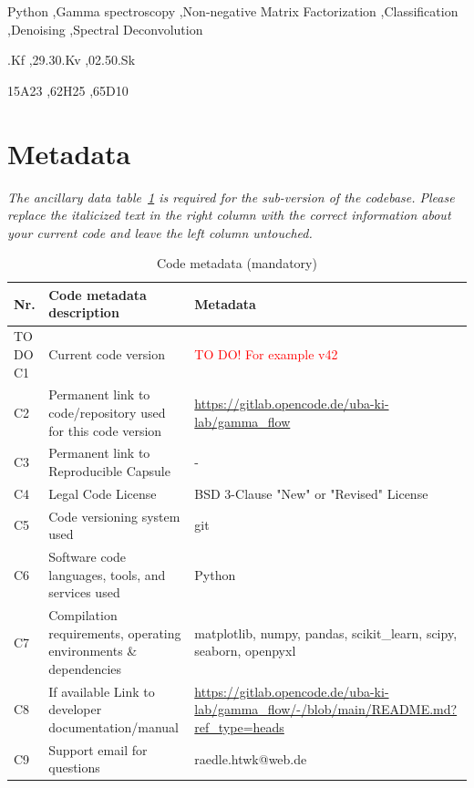 \documentclass[preprint,12pt, a4paper]{elsarticle}
\begin{document}
\begin{frontmatter}
\begin{keyword}
Python \sep Gamma spectroscopy \sep Non-negative Matrix Factorization \sep Classification \sep Denoising \sep Spectral Deconvolution

.Kf %
\sep 29.30.Kv %
\sep 02.50.Sk %

\MSC[2020] 15A23 %
\sep 62H25 %
\sep 65D10 %

\end{keyword}

\end{frontmatter}


\section*{Metadata}
\textit{The ancillary data table~\ref{codeMetadata} is required for the sub-version of the codebase. Please replace the italicized text in the right column with the correct information about your current code and leave the left column untouched.}

\begin{table}[!ht]
\begin{tabular}{|l|p{6.5cm}|p{6.5cm}|}
\hline
\textbf{Nr.} & \textbf{Code metadata description} & \textbf{Metadata} \\
\hline
TO DO C1 & Current code version & \textcolor{red}{TO DO! For example v42} \\
\hline
C2 & Permanent link to code/repository used for this code version & \url{https://gitlab.opencode.de/uba-ki-lab/gamma_flow} \\
\hline
C3  & Permanent link to Reproducible Capsule & - \\
\hline
C4 & Legal Code License & BSD 3-Clause "New" or "Revised" License \\
\hline
C5 & Code versioning system used & git\\
\hline
C6 & Software code languages, tools, and services used & Python \\
\hline
C7 & Compilation requirements, operating environments \& dependencies & matplotlib, numpy, pandas, scikit\_learn, scipy, seaborn, openpyxl \\
\hline
C8 & If available Link to developer documentation/manual & \url{https://gitlab.opencode.de/uba-ki-lab/gamma_flow/-/blob/main/README.md?ref_type=heads} \\
\hline
C9 & Support email for questions & raedle.htwk@web.de\\
\hline
\end{tabular}
\caption{Code metadata (mandatory)}
\label{codeMetadata} 
\end{table}
\end{document}
